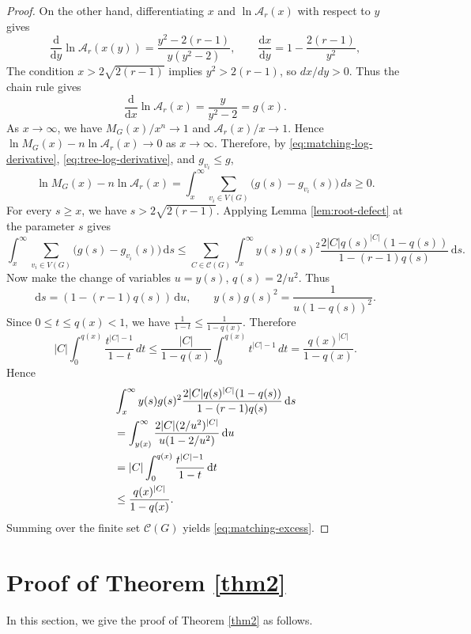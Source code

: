 \documentclass[11pt, a4paper]{article}
\begin{document}
\begin{proof}
On the other hand, differentiating $x$ and $\ln\mathcal{A}_r(x)$ with respect to $y$ gives
\[
 \frac{\mathrm{d}}{\mathrm{d}y}\ln\mathcal{A}_r(x(y))
 =\frac{y^2-2(r-1)}{y(y^2-2)},
 \qquad
 \frac{\mathrm{d} x}{\mathrm{d} y}=1-\frac{2(r-1)}{y^2},
\]
The condition $x>2\sqrt{2(r-1)}$ implies $y^2>2(r-1)$, so $dx/dy>0$.
Thus the chain rule gives
\begin{equation}\label{eq:tree-log-derivative}
 \frac{\mathrm{d}}{\mathrm{d}x}\ln\mathcal{A}_r(x)=\frac{y}{y^2-2}=g(x).
\end{equation}
As $x\to\infty$, we have $M_G(x)/x^n\to1$ and $\mathcal{A}_r(x)/x\to1$.
Hence $\ln M_G(x)-n\ln\mathcal{A}_r(x)\to0$ as $x\to\infty$.
Therefore, by \eqref{eq:matching-log-derivative}, \eqref{eq:tree-log-derivative}, and $g_{v_i}\leq g$,
\[
 \ln M_G(x)-n\ln\mathcal{A}_r(x)
 =\int_x^\infty\sum_{v_i\in V(G)}\bigl(g(s)-g_{v_i}(s)\bigr)\, ds\geq0.
\]
For every $s\ge x$, we have $s>2\sqrt{2(r-1)}$.
Applying Lemma \ref{lem:root-defect} at the parameter $s$ gives
\[
\int_x^\infty\sum_{v_i\in V(G)}\bigl(g(s)-g_{v_i}(s)\bigr)\,\mathrm{d} s \leq
\sum_{C\in\mathcal{C}(G)} \int_x^\infty y(s)g(s)^2
 \frac{2|C|q(s)^{|C|}(1-q(s))}{1-(r-1)q(s)}\, \mathrm{d}s.
\]
Now make the change of variables $u=y(s)$, $q(s)=2/u^2$.
Thus
\[
 \mathrm{d} s=(1-(r-1)q(s))\,\mathrm{d} u,
 \qquad y(s)g(s)^2=\frac1{u(1-q(s))^2}.
\]
Since $0\leq t\leq q(x)<1$, we have
$\frac1{1-t}\le\frac1{1-q(x)}$.
Therefore
\[
|C|
\int_0^{q(x)}
\frac{t^{|C|-1}}{1-t}\, dt
\le
\frac{|C|}{1-q(x)}
\int_0^{q(x)}
t^{|C|-1}\, dt
=
\frac{q(x)^{|C|}}{1-q(x)}.
\]
Hence
\begin{align*}
&\int_x^\infty y(s)g(s)^2
 \frac{2|C|q(s)^{|C|}(1-q(s))}{1-(r-1)q(s)}\, \mathrm{d}s \notag \\
&=\int_{y(x)}^\infty
       \frac{2|C|(2/u^2)^{|C|}}{u(1-2/u^2)}\,\mathrm{d} u \notag \\
&=|C|\int_0^{q(x)}\frac{t^{|C|-1}}{1-t}\,\mathrm{d} t \notag \\
&\leq\frac{q(x)^{|C|}}{1-q(x)}. 
\end{align*}
Summing over the finite set $\mathcal{C}(G)$ yields \eqref{eq:matching-excess}.
\end{proof}

\section{Proof of Theorem \ref{thm2}}
In this section, we give the proof of Theorem \ref{thm2} as follows.
\end{document}
